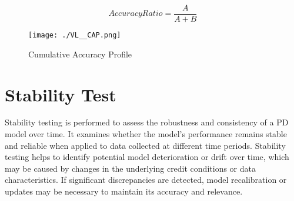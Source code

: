 \begin{equation}
Accuracy Ratio = \frac{A}{A + B} \label{eq:vl_ar}
\end{equation}

\begin{figure}[H]
	\centering
	\texttt{[image: ./VL\_\_CAP.png]}
    \caption{Cumulative Accuracy Profile}
    \label{fig:vl_cap}
\end{figure}

\section{Stability Test}
Stability testing is performed to assess the robustness and consistency of a PD model over time. It examines whether the model's performance remains stable and reliable when applied to data collected at different time periods. Stability testing helps to identify potential model deterioration or drift over time, which may be caused by changes in the underlying credit conditions or data characteristics. If significant discrepancies are detected, model recalibration or updates may be necessary to maintain its accuracy and relevance.